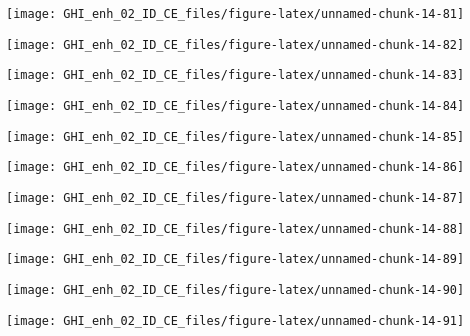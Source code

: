 \documentclass[
  10pt,
  a4paper,oneside]{article}
\begin{document}
\begin{center}\texttt{[image: GHI\_enh\_02\_ID\_CE\_files/figure-latex/unnamed-chunk-14-81]} \end{center}

\begin{center}\texttt{[image: GHI\_enh\_02\_ID\_CE\_files/figure-latex/unnamed-chunk-14-82]} \end{center}

\begin{center}\texttt{[image: GHI\_enh\_02\_ID\_CE\_files/figure-latex/unnamed-chunk-14-83]} \end{center}

\begin{center}\texttt{[image: GHI\_enh\_02\_ID\_CE\_files/figure-latex/unnamed-chunk-14-84]} \end{center}

\begin{center}\texttt{[image: GHI\_enh\_02\_ID\_CE\_files/figure-latex/unnamed-chunk-14-85]} \end{center}

\begin{center}\texttt{[image: GHI\_enh\_02\_ID\_CE\_files/figure-latex/unnamed-chunk-14-86]} \end{center}

\begin{center}\texttt{[image: GHI\_enh\_02\_ID\_CE\_files/figure-latex/unnamed-chunk-14-87]} \end{center}

\begin{center}\texttt{[image: GHI\_enh\_02\_ID\_CE\_files/figure-latex/unnamed-chunk-14-88]} \end{center}

\begin{center}\texttt{[image: GHI\_enh\_02\_ID\_CE\_files/figure-latex/unnamed-chunk-14-89]} \end{center}

\begin{center}\texttt{[image: GHI\_enh\_02\_ID\_CE\_files/figure-latex/unnamed-chunk-14-90]} \end{center}

\begin{center}\texttt{[image: GHI\_enh\_02\_ID\_CE\_files/figure-latex/unnamed-chunk-14-91]} \end{center}
\end{document}
